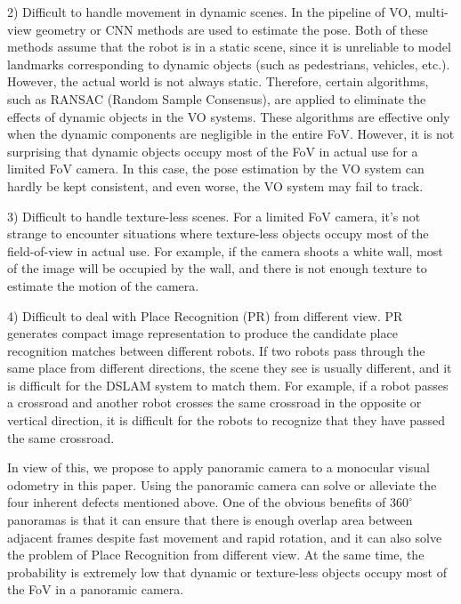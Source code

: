 2) Difficult to handle movement in dynamic scenes. 
In the pipeline of VO, multi-view geometry or CNN methods are used to estimate the pose. 
Both of these methods assume that the robot is in a static scene, since it is unreliable to model landmarks corresponding to dynamic objects  (such as pedestrians, vehicles, etc.). 
However, the actual world is not always static.
Therefore, certain algorithms, such as RANSAC (Random Sample Consensus), are applied to eliminate the effects of dynamic objects in the VO systems.
These algorithms are effective only when the dynamic components are negligible in the entire FoV.
However, it is not surprising that dynamic objects occupy most of the FoV in actual use for a limited FoV camera.
In this case, the pose estimation by the VO system can hardly be kept consistent, and even worse, the VO system may fail to track.

3) Difficult to handle texture-less scenes. 
For a limited FoV camera, it’s not strange to encounter situations where texture-less objects occupy most of the field-of-view in actual use.
For example, if the camera shoots a white wall, most of the image will be occupied by the wall, and there is not enough texture to estimate the motion of the camera.

4) Difficult to deal with Place Recognition (PR) from different view. 
PR generates compact image representation to produce the candidate place recognition matches between different robots.
If two robots pass through the same place from different directions, the scene they see is usually different, and it is difficult for the DSLAM system to match them.
For example, if a robot passes a crossroad and another robot crosses the same crossroad in the opposite or vertical direction, it is difficult for the robots to recognize that they have passed the same crossroad.

In view of this, we propose to apply panoramic camera to a monocular visual odometry in this paper.
Using the panoramic camera can solve or alleviate the four inherent defects mentioned above.
One of the obvious benefits of $360^{\circ}$ panoramas is that it can ensure that there is enough overlap area between adjacent frames despite fast movement and rapid rotation, and it can also solve the problem of Place Recognition from different view.
At the same time, the probability is extremely low that dynamic or texture-less objects occupy most of the FoV in a panoramic camera.
